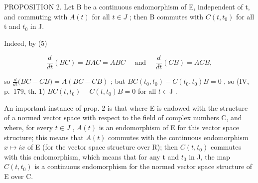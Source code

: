 PROPOSITION 2. Let B be a continuous endomorphism of E, independent of t, and commuting with \(A(t)\) for all \(t \in J\) ; then B commutes with \(C(t, t_{0})\) for all t and \(t_{0}\) in J.

Indeed, by (5)

\[
\frac {d}{d t} (B C) = B A C = A B C \quad \text { and } \quad \frac {d}{d t} (C B) = A C B,
\]

so \(\frac{d}{dt}\bigl (BC - CB\bigr) = A(BC - CB)\) ; but \(BC(t_0,t_0) - C(t_0,t_0)B = 0\) , so (IV, p.~179, th. 1) \(BC(t,t_0) - C(t,t_0)B = 0\) for all \(t\in \mathrm{J}\) .

An important instance of prop. 2 is that where E is endowed with the structure of a normed vector space with respect to the field of complex numbers C, and where, for every \(t \in J\) , \(A(t)\) is an endomorphism of E for this vector space structure; this means that \(A(t)\) commutes with the continuous endomorphism \(x \mapsto i x\) of E (for the vector space structure over R); then \(C(t, t_{0})\) commutes with this endomorphism, which means that for any t and \(t_{0}\) in J, the map \(C(t, t_{0})\) is a continuous endomorphism for the normed vector space structure of E over C.

